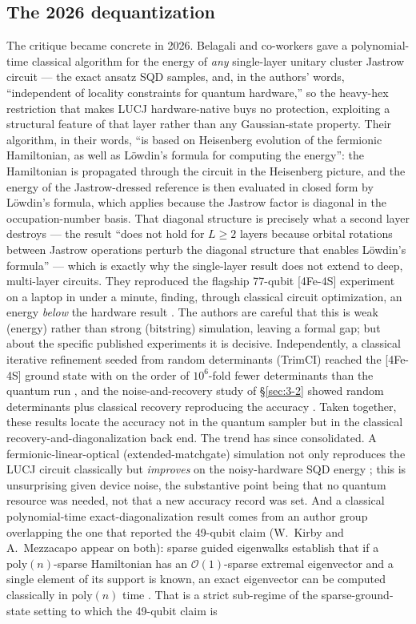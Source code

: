 \documentclass[onecolumn,a4paper]{quantumarticle}
\begin{document}
\subsection{The 2026 dequantization}\label{sec:5-3}

The critique became concrete in 2026. Belagali and co-workers gave a polynomial-time classical algorithm for the energy of \emph{any} single-layer unitary cluster Jastrow circuit --- the exact ansatz SQD samples, and, in the authors' words, ``independent of locality constraints for quantum hardware,'' so the heavy-hex restriction that makes LUCJ hardware-native buys no protection, exploiting a structural feature of that layer rather than any Gaussian-state property. Their algorithm, in their words, ``is based on Heisenberg evolution of the fermionic Hamiltonian, as well as L\"owdin's formula for computing the energy'': the Hamiltonian is propagated through the circuit in the Heisenberg picture, and the energy of the Jastrow-dressed reference is then evaluated in closed form by L\"owdin's formula, which applies because the Jastrow factor is diagonal in the occupation-number basis. That diagonal structure is precisely what a second layer destroys --- the result ``does not hold for $L\ge2$ layers because orbital rotations between Jastrow operations perturb the diagonal structure that enables L\"owdin's formula'' --- which is exactly why the single-layer result does not extend to deep, multi-layer circuits. They reproduced the flagship 77-qubit [4Fe-4S] experiment on a laptop in under a minute, finding, through classical circuit optimization, an energy \emph{below} the hardware result \cite{belagali2026}. The authors are careful that this is weak (energy) rather than strong (bitstring) simulation, leaving a formal gap; but about the specific published experiments it is decisive. Independently, a classical iterative refinement seeded from random determinants (TrimCI) reached the [4Fe-4S] ground state with on the order of $10^6$-fold fewer determinants than the quantum run \cite{zhangotten2025}, and the noise-and-recovery study of \S\ref{sec:3-2} showed random determinants plus classical recovery reproducing the accuracy \cite{vaquerosabater2026}. Taken together, these results locate the accuracy not in the quantum sampler but in the classical recovery-and-diagonalization back end. The trend has since consolidated. A fermionic-linear-optical (extended-matchgate) simulation not only reproduces the LUCJ circuit classically but \emph{improves} on the noisy-hardware SQD energy \cite{hassman2025}; this is unsurprising given device noise, the substantive point being that no quantum resource was needed, not that a new accuracy record was set. And a classical polynomial-time exact-diagonalization result comes from an author group overlapping the one that reported the 49-qubit claim (W.\ Kirby and A.\ Mezzacapo appear on both): sparse guided eigenwalks establish that if a $\mathrm{poly}(n)$-sparse Hamiltonian has an $\mathcal{O}(1)$-sparse extremal eigenvector and a single element of its support is known, an exact eigenvector can be computed classically in $\mathrm{poly}(n)$ time \cite{chin2026}. That is a strict sub-regime of the sparse-ground-state setting to which the 49-qubit claim is 
\end{document}

